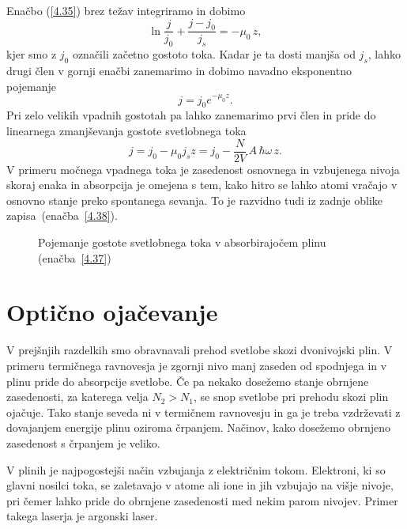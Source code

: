 Enačbo (\ref{4.35}) brez težav integriramo in dobimo 
\begin{equation}
\ln\frac{j}{j_{0}}+\frac{j-j_{0}}{j_{s}}=-\mu_{0}\, z,
\label{4.37}
\end{equation}
kjer smo z $j_{0}$ označili začetno gostoto toka. Kadar je ta dosti
manjša od $j_{s}$, lahko drugi člen v gornji enačbi zanemarimo in dobimo 
navadno eksponentno pojemanje
\begin{equation}
j = j_0 e^{-\mu_0 z}.
\end{equation}
Pri zelo velikih vpadnih gostotah pa lahko zanemarimo prvi člen in pride do 
linearnega zmanjševanja gostote svetlobnega toka
\begin{equation}
j=j_{0}-\mu_{0}j_{s}z = j_0 - \frac{N}{2V}\, A\, \hbar \omega\, z.
\label{4.38}
\end{equation}
V primeru močnega vpadnega toka je zasedenost osnovnega in vzbujenega nivoja skoraj
enaka in absorpcija je omejena s tem, kako hitro se lahko atomi vračajo
v osnovno stanje preko spontanega sevanja. To je razvidno tudi iz
zadnje oblike zapisa~(enačba~\ref{4.38}).

\begin{figure}[h]
\centering
\def\svgwidth{100truemm} 

\caption{Pojemanje gostote svetlobnega toka v absorbirajočem plinu (enačba~\ref{4.37})}
\label{fig:abs2}
\end{figure}

\section{Optično ojačevanje}
V prejšnjih razdelkih smo obravnavali prehod svetlobe skozi dvonivojski plin. V primeru
termičnega ravnovesja je zgornji nivo manj zaseden od spodnjega in v plinu pride
do absorpcije svetlobe. Če pa nekako dosežemo stanje obrnjene zasedenosti,
za katerega velja $N_{2}>N_{1}$, se snop svetlobe pri prehodu skozi plin ojačuje. 
Tako stanje seveda ni v termičnem ravnovesju in ga je treba vzdrževati z dovajanjem 
energije plinu oziroma črpanjem. 
Načinov, kako dosežemo obrnjeno zasedenost s črpanjem je veliko.  

V plinih je najpogostejši način vzbujanja z električnim tokom. Elektroni,
ki so glavni nosilci toka, se zaletavajo v atome ali ione in jih vzbujajo
na višje nivoje, pri čemer lahko pride do obrnjene zasedenosti med
nekim parom nivojev. Primer takega laserja je argonski laser. 

